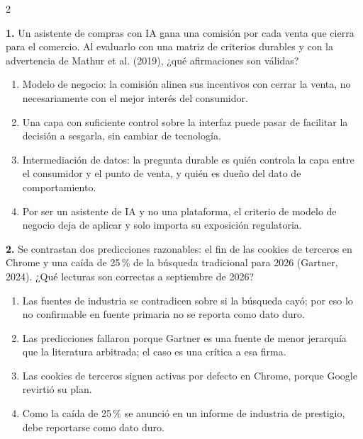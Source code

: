 \documentclass[10pt,letterpaper]{article}
\newcommand{\cas}{\framebox[1.0em]{\rule{0pt}{1.05ex}}}
\begin{document}
\begin{multicols}{2}
\begin{minipage}[t]{\columnwidth}\noindent\textbf{1.} Un asistente de compras con IA gana una comisión por cada venta que cierra para el comercio. Al evaluarlo con una matriz de criterios durables y con la advertencia de Mathur et al. (2019), ¿qué afirmaciones son válidas?
\vspace{1pt}\begin{enumerate}[label=\cas\ \alph*),leftmargin=2.3em,itemsep=1.2pt,topsep=1pt,parsep=0pt,partopsep=0pt]
\item Modelo de negocio: la comisión alinea sus incentivos con cerrar la venta, no necesariamente con el mejor interés del consumidor.
\item Una capa con suficiente control sobre la interfaz puede pasar de facilitar la decisión a sesgarla, sin cambiar de tecnología.
\item Intermediación de datos: la pregunta durable es quién controla la capa entre el consumidor y el punto de venta, y quién es dueño del dato de comportamiento.
\item Por ser un asistente de IA y no una plataforma, el criterio de modelo de negocio deja de aplicar y solo importa su exposición regulatoria.
\end{enumerate}\end{minipage}\par\vspace{3pt}
\begin{minipage}[t]{\columnwidth}\noindent\textbf{2.} Se contrastan dos predicciones razonables: el fin de las cookies de terceros en Chrome y una caída de 25\,\% de la búsqueda tradicional para 2026 (Gartner, 2024). ¿Qué lecturas son correctas a septiembre de 2026?
\vspace{1pt}\begin{enumerate}[label=\cas\ \alph*),leftmargin=2.3em,itemsep=1.2pt,topsep=1pt,parsep=0pt,partopsep=0pt]
\item Las fuentes de industria se contradicen sobre si la búsqueda cayó; por eso lo no confirmable en fuente primaria no se reporta como dato duro.
\item Las predicciones fallaron porque Gartner es una fuente de menor jerarquía que la literatura arbitrada; el caso es una crítica a esa firma.
\item Las cookies de terceros siguen activas por defecto en Chrome, porque Google revirtió su plan.
\item Como la caída de 25\,\% se anunció en un informe de industria de prestigio, debe reportarse como dato duro.

\end{enumerate}
\end{minipage}
\end{multicols}
\end{document}
